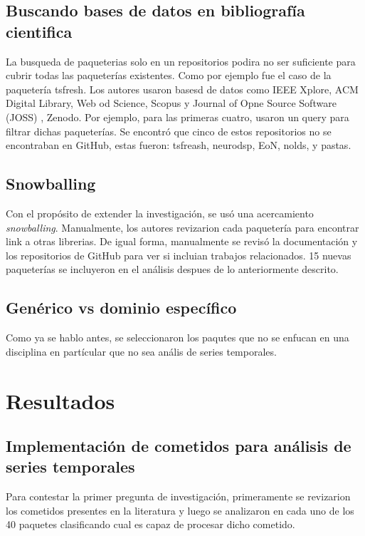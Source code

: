 \documentclass[a4paper, 11pt]{article}
\begin{document}
\subsection{Buscando bases de datos en bibliografía cientifica}

La busqueda de paqueterias solo en un repositorios podira no ser suficiente para cubrir todas las paqueterías existentes. Como por ejemplo fue el caso de la paquetería tsfresh. Los autores usaron basesd de datos como IEEE Xplore, ACM Digital Library, Web od Science, Scopus y Journal of Opne Source Software (JOSS)  , Zenodo.  Por ejemplo, para las primeras cuatro, usaron un query para filtrar dichas paqueterías. Se encontró que cinco de estos repositorios no se encontraban en GitHub, estas fueron: tsfreash, neurodsp, EoN, nolds, y pastas.

\subsection{Snowballing}

Con el propósito de extender la investigación, se usó una acercamiento \textit{snowballing}. Manualmente, los autores revizarion cada paquetería para encontrar link a otras librerias. De igual forma, manualmente se revisó la documentación y los repositorios de GitHub para ver si incluian trabajos relacionados. 15 nuevas paqueterías se incluyeron en el análisis despues de lo anteriormente descrito. 

\subsection{Genérico vs dominio específico}

Como ya se hablo antes, se seleccionaron los paqutes que no se enfucan en una disciplina en partícular que no sea anális de series temporales.


\section{Resultados}

\subsection{Implementación de cometidos para análisis de series temporales}

Para contestar la primer pregunta de investigación, primeramente se revizarion los cometidos presentes en la literatura y luego se analizaron en cada uno de los 40 paquetes clasificando cual es capaz de procesar dicho cometido.
\end{document}
